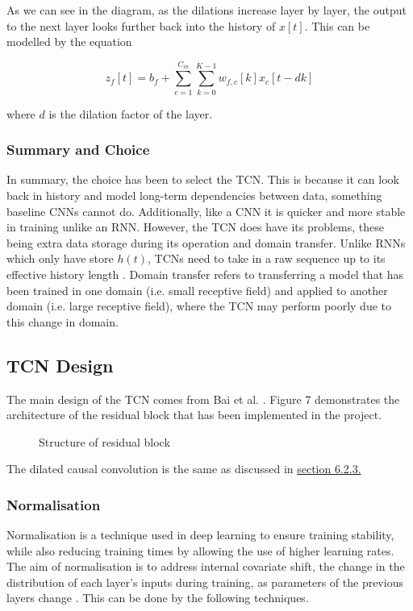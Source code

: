 As we can see in the diagram, as the dilations increase layer by layer,
the output to the next layer looks further back into the history of
$x[t]$. This can be modelled by the equation

\begin{equation}
  z_f[t] = b_f + \sum_{c=1}^{C_{in}} \sum_{k=0}^{K-1} w_{f,c}[k] x_c[t-dk]
\end{equation}

where $d$ is the dilation factor of the layer. 


\subsubsection{Summary and Choice}
In summary, the choice has been to select the TCN. This is because it 
can look back in history and model long-term dependencies
between data, something baseline CNNs cannot do. Additionally, like a CNN
it is quicker and more stable in training unlike an RNN. However, the TCN
does have its problems, these being extra data storage during its operation
and domain transfer. Unlike RNNs which only have store $h(t)$, TCNs need
to take in a raw sequence up to its effective history length \cite{bai_2018_an}.
Domain transfer refers to transferring a model that has been trained in 
one domain (i.e. small receptive field) and applied to another domain
(i.e. large receptive field), where the TCN may perform poorly due to 
this change in domain.


\subsection{TCN Design}

The main design of the TCN comes from Bai et al. \cite{bai_2018_an}. Figure 7
demonstrates the architecture of the residual block that has been 
implemented in the project.

\begin{figure}[H]
    \centering
    
    \caption{Structure of residual block}
    \label{fig:residual}
\end{figure}

The dilated causal convolution is the same as discussed in \hyperref[sec:tcn_sel]{section 6.2.3.}

\subsubsection{Normalisation}
Normalisation is a technique used in deep learning to ensure training stability, 
while also reducing training times by allowing the use of higher learning rates. 
The aim of normalisation is to address internal covariate shift, the change in
the distribution of each layer's inputs during training, as parameters of the
previous layers change \cite{ioffe_2015_batch}. This can be done by the following 
techniques.



